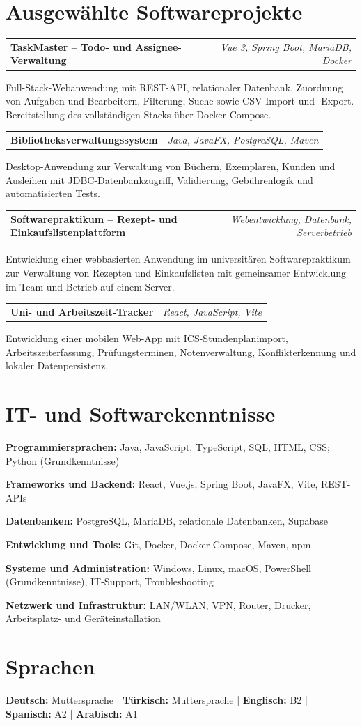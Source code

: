 \documentclass[10pt,a4paper]{article}
\makeatletter
\newcommand{\projectentry}[3]{%
\noindent
\begin{tabularx}{\textwidth}{@{}X r@{}}
  \textbf{#1} & \textit{#2}
\end{tabularx}
#3
}
\makeatother
\begin{document}
\section{Ausgewählte Softwareprojekte}

\projectentry
  {TaskMaster -- Todo- und Assignee-Verwaltung}
  {Vue 3, Spring Boot, MariaDB, Docker}
  {Full-Stack-Webanwendung mit REST-API, relationaler Datenbank, Zuordnung von Aufgaben und Bearbeitern, Filterung, Suche sowie CSV-Import und -Export. Bereitstellung des vollständigen Stacks über Docker Compose.}

\projectentry
  {Bibliotheksverwaltungssystem}
  {Java, JavaFX, PostgreSQL, Maven}
  {Desktop-Anwendung zur Verwaltung von Büchern, Exemplaren, Kunden und Ausleihen mit JDBC-Datenbankzugriff, Validierung, Gebührenlogik und automatisierten Tests.}

\projectentry
  {Softwarepraktikum -- Rezept- und Einkaufslistenplattform}
  {Webentwicklung, Datenbank, Serverbetrieb}
  {Entwicklung einer webbasierten Anwendung im universitären Softwarepraktikum zur Verwaltung von Rezepten und Einkaufslisten mit gemeinsamer Entwicklung im Team und Betrieb auf einem Server.}

\projectentry
  {Uni- und Arbeitszeit-Tracker}
  {React, JavaScript, Vite}
  {Entwicklung einer mobilen Web-App mit ICS-Stundenplanimport, Arbeitszeiterfassung, Prüfungsterminen, Notenverwaltung, Konflikterkennung und lokaler Datenpersistenz.}

\section{IT- und Softwarekenntnisse}

\textbf{Programmiersprachen:}
Java, JavaScript, TypeScript, SQL, HTML, CSS; Python (Grundkenntnisse)

\vspace{0.18em}
\textbf{Frameworks und Backend:}
React, Vue.js, Spring Boot, JavaFX, Vite, REST-APIs

\vspace{0.18em}
\textbf{Datenbanken:}
PostgreSQL, MariaDB, relationale Datenbanken, Supabase

\vspace{0.18em}
\textbf{Entwicklung und Tools:}
Git, Docker, Docker Compose, Maven, npm

\vspace{0.18em}
\textbf{Systeme und Administration:}
Windows, Linux, macOS, PowerShell (Grundkenntnisse), IT-Support, Troubleshooting

\vspace{0.18em}
\textbf{Netzwerk und Infrastruktur:}
LAN/WLAN, VPN, Router, Drucker, Arbeitsplatz- und Geräteinstallation

\section{Sprachen}

\textbf{Deutsch:} Muttersprache
\enspace|\enspace
\textbf{Türkisch:} Muttersprache
\enspace|\enspace
\textbf{Englisch:} B2
\enspace|\enspace
\textbf{Spanisch:} A2
\enspace|\enspace
\textbf{Arabisch:} A1
\end{document}
